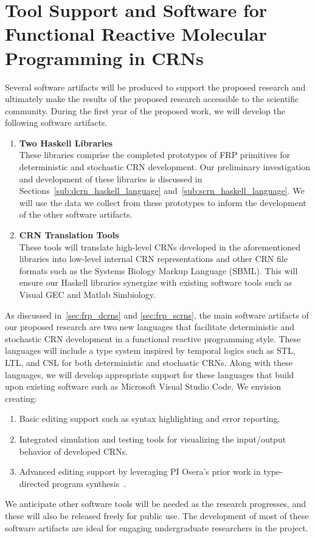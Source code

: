 
\section{Tool Support and Software for Functional Reactive Molecular Programming in CRNs}
\label{sec:software_support}

Several software artifacts will be produced to support the proposed research and ultimately make the results of the proposed research accessible to the scientific community.
During the first year of the proposed work, we will develop the following software artifacts.
\begin{enumerate}
	\item \textbf{Two Haskell Libraries}\\
    These libraries comprise the completed prototypes of FRP primitives for deterministic and stochastic CRN development.
	Our preliminary investigation and development of these libraries is discussed in Sections~\ref{sub:dcrn_haskell_language} and~\ref{sub:scrn_haskell_language}.
	We will use the data we collect from these prototypes to inform the development of the other software artifacts.
	
	\item \textbf{CRN Translation Tools}\\
    These tools will translate high-level CRNs developed in the aforementioned libraries into low-level internal CRN representations and other CRN file formats such as the Systems Biology Markup Language (SBML).
	This will ensure our Haskell libraries synergize with existing software tools such as Visual GEC and Matlab Simbiology.
\end{enumerate}

As discussed in~\autoref{sec:frp_dcrns} and \autoref{sec:frp_scrns}, the main software artifacts of our proposed research are two new languages that facilitate deterministic and stochastic CRN development in a functional reactive programming style.
These languages will include a type system inspired by temporal logics such as STL, LTL, and CSL for both deterministic and stochastic CRNs.
Along with these languages, we will develop appropriate support for these languages that build upon existing software such as Microsoft Visual Studio Code.
We envision creating:
\begin{enumerate}
	\item Basic editing support such as syntax highlighting and error reporting.
	\item Integrated simulation and testing tools for visualizing the input/output behavior of developed CRNs.
  \item Advanced editing support by leveraging PI Osera's prior work in type-directed program synthesis~\cite{osera:thesis:2015, osera:pldi:2015, frankle:popl:2015, osera:tyde:2019}.
\end{enumerate}

We anticipate other software tools will be needed as the research progresses, and these will also be released freely for public use.
The development of most of these software artifacts are ideal for engaging undergraduate researchers in the project.
